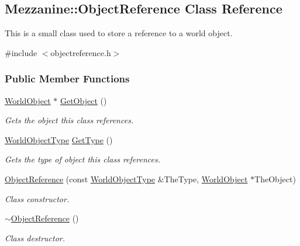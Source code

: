 \hypertarget{classMezzanine_1_1ObjectReference}{
\subsection{Mezzanine::ObjectReference Class Reference}
\label{classMezzanine_1_1ObjectReference}
}


This is a small class used to store a reference to a world object.  




{\ttfamily \#include $<$objectreference.h$>$}

\subsubsection*{Public Member Functions}
\begin{DoxyCompactItemize}
\item 
\hyperlink{classMezzanine_1_1WorldObject}{WorldObject} $\ast$ \hyperlink{classMezzanine_1_1ObjectReference_ad0be2b6ed910bbf8d68f2de89af64973}{GetObject} ()
\begin{DoxyCompactList}\small\item\em Gets the object this class references. \item\end{DoxyCompactList}\item 
\hyperlink{namespaceMezzanine_a30335416fc857844e8360c84d1d1b56c}{WorldObjectType} \hyperlink{classMezzanine_1_1ObjectReference_af7bca8f5979bf073eb96aa80508973e4}{GetType} ()
\begin{DoxyCompactList}\small\item\em Gets the type of object this class references. \item\end{DoxyCompactList}\item 
\hyperlink{classMezzanine_1_1ObjectReference_a3889c2c90442c60ba5107efaa7c926b7}{ObjectReference} (const \hyperlink{namespaceMezzanine_a30335416fc857844e8360c84d1d1b56c}{WorldObjectType} \&TheType, \hyperlink{classMezzanine_1_1WorldObject}{WorldObject} $\ast$TheObject)
\begin{DoxyCompactList}\small\item\em Class constructor. \item\end{DoxyCompactList}\item 
\hypertarget{classMezzanine_1_1ObjectReference_aabb1fbfa7abe2d333c7946941368d2e3}{
\hyperlink{classMezzanine_1_1ObjectReference_aabb1fbfa7abe2d333c7946941368d2e3}{$\sim$ObjectReference} ()}
\label{classMezzanine_1_1ObjectReference_aabb1fbfa7abe2d333c7946941368d2e3}

\begin{DoxyCompactList}\small\item\em Class destructor. \item\end{DoxyCompactList}\end{DoxyCompactItemize}
